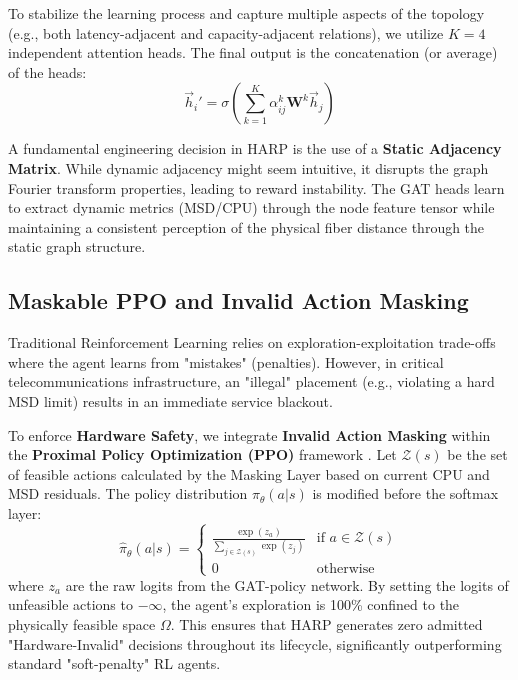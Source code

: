 \documentclass[12pt, a4paper, reqno, oneside]{book}
\begin{document}
To stabilize the learning process and capture multiple aspects of the topology (e.g., both latency-adjacent and capacity-adjacent relations), we utilize $K=4$ independent attention heads. The final output is the concatenation (or average) of the heads:
\begin{equation}
\vec{h}_i' = \sigma \left( \sum_{k=1}^K \alpha_{ij}^k \mathbf{W}^k \vec{h}_j \right)
\end{equation}

A fundamental engineering decision in HARP is the use of a \textbf{Static Adjacency Matrix}. While dynamic adjacency might seem intuitive, it disrupts the graph Fourier transform properties, leading to reward instability. The GAT heads learn to extract dynamic metrics (MSD/CPU) through the node feature tensor while maintaining a consistent perception of the physical fiber distance through the static graph structure.

\subsection{Maskable PPO and Invalid Action Masking}
Traditional Reinforcement Learning relies on exploration-exploitation trade-offs where the agent learns from "mistakes" (penalties). However, in critical telecommunications infrastructure, an "illegal" placement (e.g., violating a hard MSD limit) results in an immediate service blackout.

To enforce \textbf{Hardware Safety}, we integrate \textbf{Invalid Action Masking} within the \textbf{Proximal Policy Optimization (PPO)} framework \cite{huang2022closer}. Let $\mathcal{Z}(s)$ be the set of feasible actions calculated by the Masking Layer based on current CPU and MSD residuals. The policy distribution $\pi_\theta(a|s)$ is modified before the softmax layer:
\begin{equation}
\hat{\pi}_\theta(a|s) = 
\begin{cases} 
\frac{\exp(z_a)}{\sum_{j \in \mathcal{Z}(s)} \exp(z_j)} & \text{if } a \in \mathcal{Z}(s) \\
0 & \text{otherwise}
\end{cases}
\end{equation}
where $z_a$ are the raw logits from the GAT-policy network. By setting the logits of unfeasible actions to $-\infty$, the agent's exploration is 100\% confined to the physically feasible space $\Omega$. This ensures that HARP generates zero admitted "Hardware-Invalid" decisions throughout its lifecycle, significantly outperforming standard "soft-penalty" RL agents.
\end{document}
